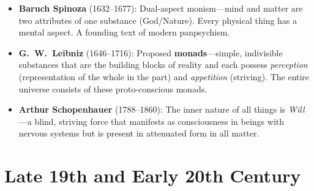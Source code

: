 \documentclass[11pt,a4paper]{report}
\begin{document}
\begin{histbox}
\begin{itemize}[leftmargin=1.5em]
  \item \textbf{Baruch Spinoza} (1632--1677): Dual-aspect monism---mind and matter are two attributes of one substance (God/Nature). Every physical thing has a mental aspect. A founding text of modern panpsychism.
  \item \textbf{G.\ W.\ Leibniz} (1646--1716): Proposed \textbf{monads}---simple, indivisible substances that are the building blocks of reality and each possess \emph{perception} (representation of the whole in the part) and \emph{appetition} (striving). The entire universe consists of these proto-conscious monads.
  \item \textbf{Arthur Schopenhauer} (1788--1860): The inner nature of all things is \emph{Will}---a blind, striving force that manifests as consciousness in beings with nervous systems but is present in attenuated form in all matter.
\end{itemize}
\end{histbox}

\section{Late 19th and Early 20th Century}
\end{document}
